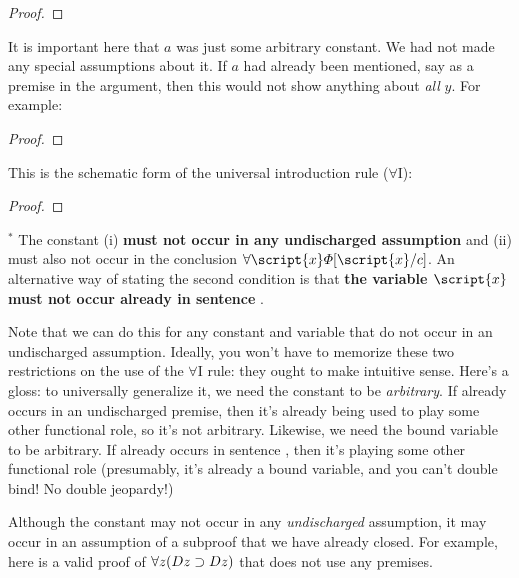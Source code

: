 \begin{proof}
	 
	 
	 
\end{proof}

It is important here that $a$ was just some arbitrary constant. We had not made any special assumptions about it. If $a$ had already been mentioned, say as a premise in the argument, then this would not show anything about \emph{all} $y$. For example:

\begin{proof}
	 \pr{}
	 
	 
\end{proof}


This is the schematic form of the universal introduction rule ($\forall$I):

\begin{proof}
	 
\end{proof}
$^\ast$ The constant  (i) \textbf{must not occur in any undischarged assumption} and {\color{black}(ii) must also not occur in the conclusion $\qt{\forall}{\script{x}}\metaA{}\substitute{c}{\script{x}}$. An alternative way of stating the second condition is that \textbf{the variable $\script{x}$ must not occur already in sentence \metaA{}}.} 

Note that we can do this for any constant and variable that do not occur in an undischarged assumption. {\color{black}Ideally, you won't have to memorize these two restrictions on the use of the $\forall$I rule: they ought to make intuitive sense. Here's a gloss: to universally generalize it, we need the constant  to be \textit{arbitrary}. If  already occurs in an undischarged premise, then it's already being used to play some other functional role, so it's not arbitrary. Likewise, we need the bound variable  to be arbitrary. If  already occurs in sentence \metaA{}, then it's playing some other functional role (presumably, it's already a bound variable, and you can't double bind! No double jeopardy!)}

Although the constant  may not occur in any \emph{undischarged} assumption, it may occur in an assumption of a subproof that we have already closed. For example, here is a valid proof of $\forall z(Dz \supset Dz)$ that does not use any premises. 

